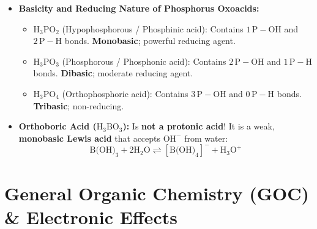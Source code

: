 \documentclass[10pt,twoside,openright]{book}
\begin{document}
\begin{trapbox}
\begin{itemize}
  \item \textbf{Basicity and Reducing Nature of Phosphorus Oxoacids:}
  \begin{itemize}
    \item $\text{H}_3\text{PO}_2$ (Hypophosphorous / Phosphinic acid): Contains $1\,\text{P}-\text{OH}$ and $2\,\text{P}-\text{H}$ bonds. \textbf{Monobasic}; powerful reducing agent.
    \item $\text{H}_3\text{PO}_3$ (Phosphorous / Phosphonic acid): Contains $2\,\text{P}-\text{OH}$ and $1\,\text{P}-\text{H}$ bonds. \textbf{Dibasic}; moderate reducing agent.
    \item $\text{H}_3\text{PO}_4$ (Orthophosphoric acid): Contains $3\,\text{P}-\text{OH}$ and $0\,\text{P}-\text{H}$ bonds. \textbf{Tribasic}; non-reducing.
  \end{itemize}
  \item \textbf{Orthoboric Acid ($\text{H}_3\text{BO}_3$):} Is \textbf{not a protonic acid}! It is a weak, \textbf{monobasic Lewis acid} that accepts $\text{OH}^-$ from water:
  \begin{equation*}
    \text{B(OH)}_3 + 2\text{H}_2\text{O} \rightleftharpoons [\text{B(OH)}_4]^- + \text{H}_3\text{O}^+
  \end{equation*}
\end{itemize}
\end{trapbox}


\section{General Organic Chemistry (GOC) \& Electronic Effects}
\end{document}
